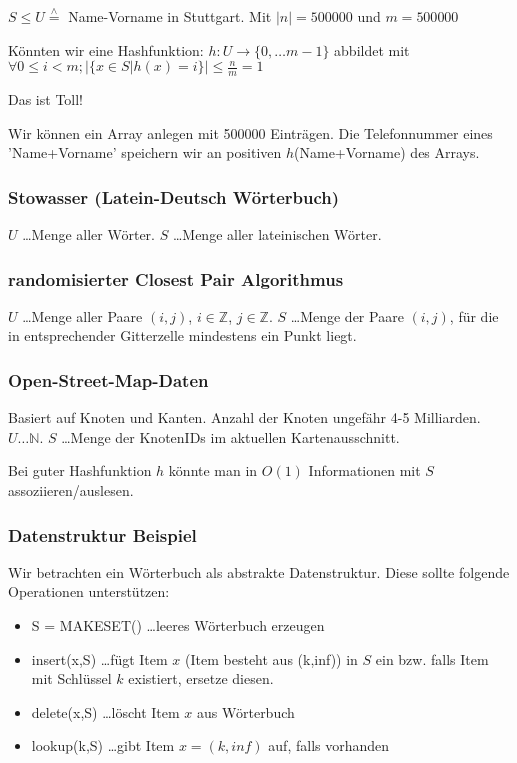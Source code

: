 \minisec{} $S \leq U \overset{\wedge}{=}$ Name-Vorname in Stuttgart. Mit $|n| = 500000$ und $m = 500 000$

\minisec{} Könnten wir eine Hashfunktion: $h:U \rightarrow \{ 0,\dots m-1 \}$ abbildet mit $\forall 0 \leq i < m ; \big| \{ x\in S | h(x)=i \} \big| \leq \frac{n}{m} = 1$ %

\minisec{} Das ist Toll!

\minisec{} Wir können ein Array anlegen mit 500000 Einträgen. Die Telefonnummer eines 'Name+Vorname' speichern wir an positiven $h$(Name+Vorname) des Arrays.

\subsubsection{Stowasser (Latein-Deutsch Wörterbuch)}
$U$ \dots Menge aller Wörter. $S$ \dots Menge aller lateinischen Wörter.

\subsubsection{randomisierter Closest Pair Algorithmus}
$U$ \dots Menge aller Paare $(i,j)$, $i \in \mathbb{Z}$, $j \in \mathbb{Z}$. $S$ \dots Menge der Paare $(i,j)$, für die in entsprechender Gitterzelle mindestens ein Punkt liegt.

\subsubsection{Open-Street-Map-Daten}
Basiert auf Knoten und Kanten. Anzahl der Knoten ungefähr 4-5 Milliarden. $U \dots \mathbb{N}$. $S$ \dots Menge der KnotenIDs im aktuellen Kartenausschnitt.

\minisec{} Bei guter Hashfunktion $h$ könnte man in $O(1)$ Informationen mit $S$ assoziieren/auslesen.

\subsubsection{Datenstruktur Beispiel}
Wir betrachten ein Wörterbuch als abstrakte Datenstruktur. Diese sollte folgende Operationen unterstützen:
\begin{itemize}
	\item[] S = MAKESET() \dots leeres Wörterbuch erzeugen
	\item[] insert(x,S) \dots fügt Item $x$ (Item besteht aus (k,inf)) in $S$ ein bzw. falls Item mit Schlüssel $k$ existiert, ersetze diesen.
	\marginpar{\textcolor{blue}{\scriptsize z.B. Schlüssel: Name+Vorname; Info: Tel.nr.}}
	\item[] delete(x,S) \dots löscht Item $x$ aus Wörterbuch
	\item[] lookup(k,S) \dots gibt Item $x = (k,inf)$ auf, falls vorhanden
	\marginpar{\textcolor{blue}{\scriptsize $k$ eindeutig}}
\end{itemize}


